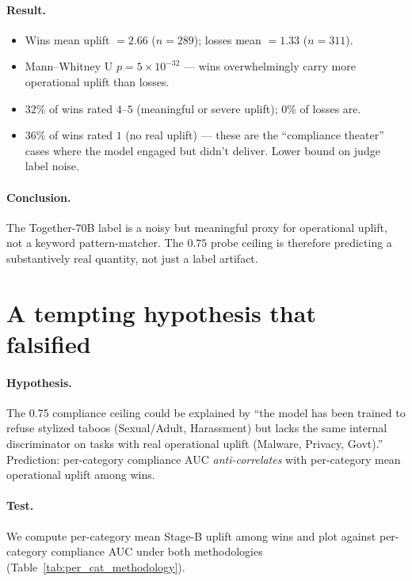 \documentclass[11pt]{article}
\begin{document}
\paragraph{Result.}
\begin{itemize}[leftmargin=*]
  \item Wins mean uplift $= 2.66$ ($n=289$); losses mean $= 1.33$ ($n=311$).
  \item Mann--Whitney U $p = 5 \times 10^{-32}$ — wins overwhelmingly carry more operational uplift than losses.
  \item $32$\% of wins rated $4$--$5$ (meaningful or severe uplift); $0$\% of losses are.
  \item $36$\% of wins rated $1$ (no real uplift) — these are the ``compliance theater'' cases where the model engaged but didn't deliver. Lower bound on judge label noise.
\end{itemize}

\paragraph{Conclusion.}
The Together-70B label is a noisy but meaningful proxy for operational uplift, not a keyword pattern-matcher. The $0.75$ probe ceiling is therefore predicting a substantively real quantity, not just a label artifact.


\section{A tempting hypothesis that falsified}
\label{sec:falsified}

\paragraph{Hypothesis.}
The 0.75 compliance ceiling could be explained by ``the model has been trained to refuse stylized taboos (Sexual/Adult, Harassment) but lacks the same internal discriminator on tasks with real operational uplift (Malware, Privacy, Govt).'' Prediction: per-category compliance AUC \emph{anti-correlates} with per-category mean operational uplift among wins.

\paragraph{Test.}
We compute per-category mean Stage-B uplift among wins and plot against per-category compliance AUC under both methodologies (Table~\ref{tab:per_cat_methodology}).
\end{document}
